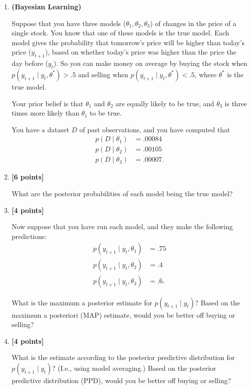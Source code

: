\documentclass{article}
\newcounter{totalpoints}
\newcommand{\points}[1]{{\addtocounter{totalpoints}{#1}\textbf{[#1 points]}}}
\begin{document}
\begin{enumerate}
\clearpage
\item \textbf{(Bayesian Learning)}

Suppose that you have three models ($\theta_1,\theta_2,\theta_3$) of changes in the price of a single stock.
You know that one of these models is the true model.  Each model gives the probability that tomorrow's price will be higher than today's price ($y_{t+1}$), based on whether today's price was higher than the price the day before ($y_t$).  So you can make money on average by buying the stock when $p(y_{t+1} \mid y_t, \theta^*) > .5$ and selling when $p(y_{t+1} \mid y_t, \theta^*) < .5$, where $\theta^*$ is the true model.

Your prior belief is that $\theta_1$ and $\theta_2$ are equally likely to be true, and $\theta_3$ is three times more likely than $\theta_1$ to be true.

You have a dataset $D$ of past observations, and you have computed that
\begin{align*}
    p(D \mid \theta_1) &= .00084 \\
    p(D \mid \theta_2) &= .00105 \\
    p(D \mid \theta_3) &= .00007.
\end{align*}

\item \points{6}
What are the posterior probabilities of each model being the true model?
\begin{answer}{1.5in}
\end{answer}

\item \points{4}
Now suppose that you have run each model, and they make the following predictions:
\begin{align*}
    p(y_{t+1} \mid y_t, \theta_1) &= .75 \\
    p(y_{t+1} \mid y_t, \theta_2) &= .4 \\
    p(y_{t+1} \mid y_t, \theta_3) &= .6.
\end{align*}

What is the maximum a posterior estimate for $p(y_{t+1} \mid y_t)$?
Based on the maximum a posteriori (MAP) estimate, would you be better off buying or selling?

\begin{answer}{1.5in}
\end{answer}

\item \points{4}

What is the estimate according to the posterior predictive distribution for $p(y_{t+1} \mid y_t)$?
(I.e., using model averaging.)
Based on the posterior predictive distribution (PPD), would you be better off buying or selling?

\begin{answer}{1.5in}
\end{answer}

\end{enumerate}
\end{document}

